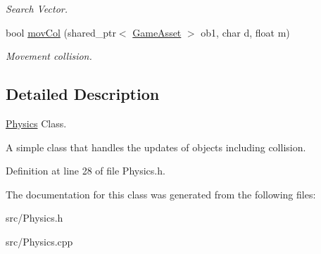 \begin{DoxyCompactItemize}
\begin{DoxyCompactList}\small\item\em Search Vector. \end{DoxyCompactList}\item 
\hypertarget{classPhysics_a18d6624118907a527a1ac69878a39f95}{bool \hyperlink{classPhysics_a18d6624118907a527a1ac69878a39f95}{mov\-Col} (shared\-\_\-ptr$<$ \hyperlink{classGameAsset}{Game\-Asset} $>$ ob1, char d, float m)}\label{classPhysics_a18d6624118907a527a1ac69878a39f95}

\begin{DoxyCompactList}\small\item\em Movement collision. \end{DoxyCompactList}\end{DoxyCompactItemize}


\subsection{Detailed Description}
\hyperlink{classPhysics}{Physics} Class. 

A simple class that handles the updates of objects including collision. 

Definition at line 28 of file Physics.\-h.



The documentation for this class was generated from the following files\-:\begin{DoxyCompactItemize}
\item 
src/Physics.\-h\item 
src/Physics.\-cpp\end{DoxyCompactItemize}
